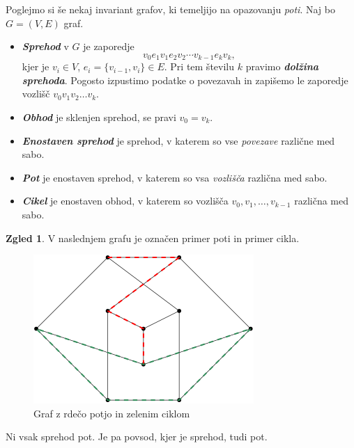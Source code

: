 \documentclass[11pt]{book}
\def\definicija{\color{rdeca}\bf\em}
\theoremstyle{definition}
\theoremstyle{zgled}
\newtheorem*{zgled}{Zgled}
\theoremstyle{odprtproblem}
\theoremstyle{domacanaloga}
\theoremstyle{izrek}
\begin{document}
Poglejmo si še nekaj invariant grafov, ki temeljijo na opazovanju \emph{poti}. Naj bo $G = (V,E)$ graf. 

\begin{itemize}
    \item {\definicija Sprehod} v $G$ je zaporedje
    \[
        v_0 e_1 v_1 e_2 v_2 \cdots v_{k-1} e_k v_k,
    \]
    kjer je $v_i \in V$, $e_i = \{ v_{i-1}, v_i \} \in E$. Pri tem številu $k$ pravimo {\definicija dolžina sprehoda}. Pogosto izpustimo podatke o povezavah in zapišemo le zaporedje vozlišč $v_0 v_1 v_2 \dots v_k$.

    \item {\definicija Obhod} je sklenjen sprehod, se pravi $v_0 = v_k$.
    \item {\definicija Enostaven sprehod} je sprehod, v katerem so vse \emph{povezave} različne med sabo.
    \item {\definicija Pot} je enostaven sprehod, v katerem so vsa \emph{vozlišča} različna med sabo.
    \item {\definicija Cikel} je enostaven obhod, v katerem so vozlišča $v_0, v_1, \dots, v_{k-1}$ različna med sabo.
\end{itemize}

\begin{zgled}
    V naslednjem grafu je označen primer poti in primer cikla.
    \begin{figure}[h]
        \centering
        \includegraphics[width=0.5\linewidth]{img/grafi-pot-cikel.png}
        \caption{Graf z rdečo potjo in zelenim ciklom}
    \end{figure}
\end{zgled}

Ni vsak sprehod pot. Je pa povsod, kjer je sprehod, tudi pot.
\end{document}
